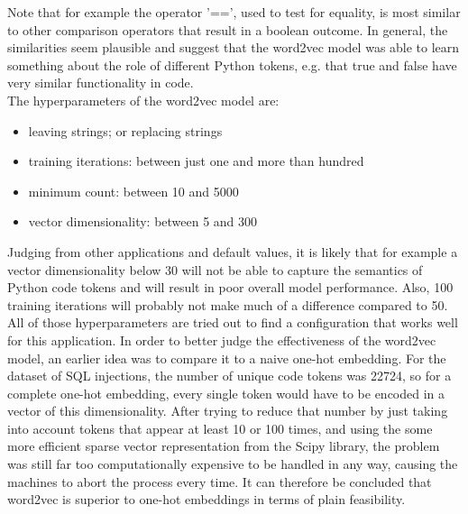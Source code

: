 \documentclass[
a4paper,
pagesize,
pdftex,
12pt,
twoside, %
BCOR=5mm, %
ngerman,
fleqn,
final,
]{scrartcl}
\begin{document}
	Note that for example the operator '==', used to test for equality, is most similar to other comparison operators that result in a boolean outcome. In general, the similarities seem plausible and suggest that the word2vec model was able to learn something about the role of different Python tokens, e.g. that true and false have very similar functionality in code.\\ 
	The hyperparameters of the word2vec model are:
	\begin{itemize}[noitemsep]
		\item leaving strings; or replacing strings
		\item training iterations: between just one and more than hundred
		\item minimum count: between 10 and 5000
		\item vector dimensionality: between 5 and 300
	\end{itemize}
	
	Judging from other applications and default values, it is likely that for example a vector dimensionality below 30 will not be able to capture the semantics of Python code tokens and will result in poor overall model performance. Also, 100 training iterations will probably not make much of a difference compared to 50. All of those hyperparameters are tried out to find a configuration that works well for this application.
	In order to better judge the effectiveness of the word2vec model, an earlier idea was to compare it to a naive one-hot embedding. For the dataset of SQL injections, the number of unique code tokens was 22724, so for a complete one-hot embedding, every single token would have to be encoded in a vector of this dimensionality. After trying to reduce that number by just taking into account tokens that appear at least 10 or 100 times, and using the some more efficient sparse vector representation from the Scipy library, the problem was still far too computationally expensive to be handled in any way, causing the machines to abort the process every time. It can therefore be concluded that word2vec is superior to one-hot embeddings in terms of plain feasibility.
	
	
	
\end{document}
